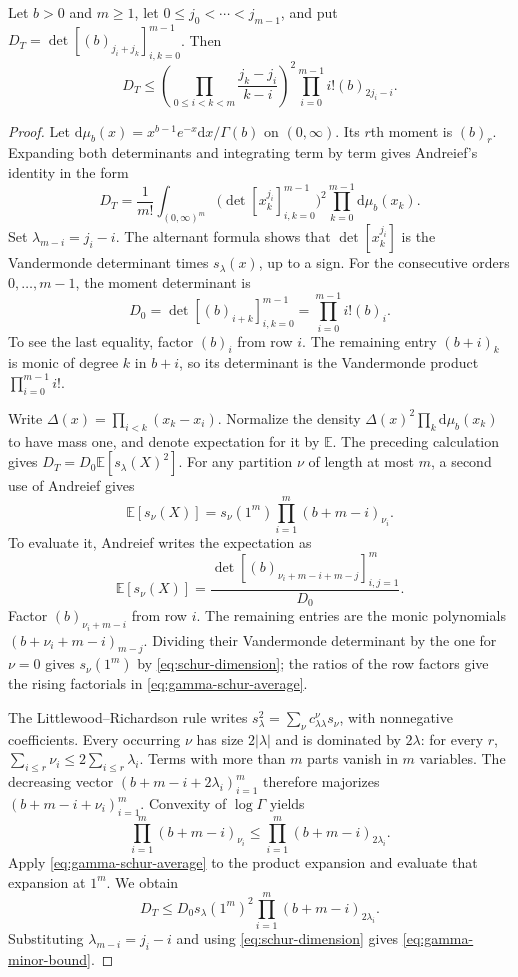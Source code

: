 \begin{lemma}\label{lem:gamma-schur}
Let $b>0$ and $m\geq1$, let $0\leq j_0<\cdots<j_{m-1}$, and put
$D_T=\det[(b)_{j_i+j_k}]_{i,k=0}^{m-1}$. Then
\begin{equation}\label{eq:gamma-minor-bound}
 D_T\leq
 \left(\prod_{0\leq i<k<m}\frac{j_k-j_i}{k-i}\right)^2
 \prod_{i=0}^{m-1}i!(b)_{2j_i-i}.
\end{equation}
\end{lemma}
\begin{proof}
Let $\mathrm d\mu_b(x)=x^{b-1}e^{-x}\mathrm dx/\Gamma(b)$ on
$(0,\infty)$. Its $r$th moment is $(b)_r$. Expanding both determinants
and integrating term by term gives Andreief's identity in the form
\[
 D_T=\frac1{m!}\int_{(0,\infty)^m}
          \bigl(\det[x_k^{j_i}]_{i,k=0}^{m-1}\bigr)^2
          \prod_{k=0}^{m-1}\mathrm d\mu_b(x_k).
\]
Set $\lambda_{m-i}=j_i-i$. The alternant formula shows that
$\det[x_k^{j_i}]$ is the Vandermonde determinant times $s_\lambda(x)$,
up to a sign. For the consecutive orders $0,\ldots,m-1$, the moment
determinant is
\[
 D_0=\det[(b)_{i+k}]_{i,k=0}^{m-1}
     =\prod_{i=0}^{m-1}i!(b)_i.
\]
To see the last equality, factor $(b)_i$ from row $i$. The remaining
entry $(b+i)_k$ is monic of degree $k$ in $b+i$, so its determinant is
the Vandermonde product $\prod_{i=0}^{m-1}i!$.

Write $\Delta(x)=\prod_{i<k}(x_k-x_i)$. Normalize the density
$\Delta(x)^2\prod_k\mathrm d\mu_b(x_k)$ to have mass one, and denote
expectation for it by $\mathbb E$. The preceding calculation gives
$D_T=D_0\mathbb E[s_\lambda(X)^2]$. For any partition $\nu$ of length
at most $m$, a second use of Andreief gives
\begin{equation}\label{eq:gamma-schur-average}
 \mathbb E[s_\nu(X)]
 =s_\nu(1^m)\prod_{i=1}^m(b+m-i)_{\nu_i}.
\end{equation}
To evaluate it, Andreief writes the expectation as
\[
 \mathbb E[s_\nu(X)]
 =\frac{\det[(b)_{\nu_i+m-i+m-j}]_{i,j=1}^m}{D_0}.
\]
Factor $(b)_{\nu_i+m-i}$ from row $i$. The remaining entries are the
monic polynomials $(b+\nu_i+m-i)_{m-j}$. Dividing their Vandermonde
determinant by the one for $\nu=0$ gives
$s_\nu(1^m)$ by \eqref{eq:schur-dimension}; the ratios of the row
factors give the rising factorials in \eqref{eq:gamma-schur-average}.

The Littlewood--Richardson rule writes
$s_\lambda^2=\sum_\nu c_{\lambda\lambda}^{\nu}s_\nu$, with
nonnegative coefficients. Every occurring $\nu$ has size $2|\lambda|$
and is dominated by $2\lambda$: for every $r$,
$\sum_{i\leq r}\nu_i\leq2\sum_{i\leq r}\lambda_i$.
Terms with more than $m$ parts vanish in $m$ variables.
The decreasing vector $(b+m-i+2\lambda_i)_{i=1}^m$ therefore
majorizes $(b+m-i+\nu_i)_{i=1}^m$. Convexity of $\log\Gamma$ yields
\[
 \prod_{i=1}^m(b+m-i)_{\nu_i}
 \leq\prod_{i=1}^m(b+m-i)_{2\lambda_i}.
\]
Apply \eqref{eq:gamma-schur-average} to the product expansion and
evaluate that expansion at $1^m$. We obtain
\[
 D_T\leq D_0s_\lambda(1^m)^2
                    \prod_{i=1}^m(b+m-i)_{2\lambda_i}.
\]
Substituting $\lambda_{m-i}=j_i-i$ and using
\eqref{eq:schur-dimension} gives \eqref{eq:gamma-minor-bound}.
\end{proof}

